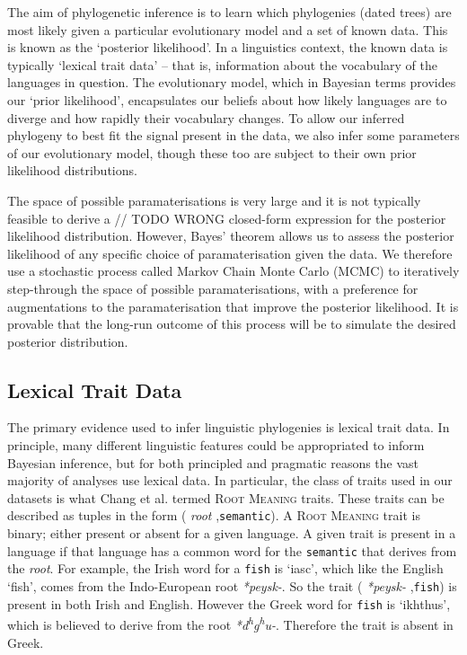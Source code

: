 \documentclass[10pt,journal,compsoc]{IEEEtran}
\newcommand{\ts}{\textsuperscript}
\begin{document}
The aim of phylogenetic inference is to learn which phylogenies (dated trees) are most likely given a particular evolutionary model and a set of known data. This is known as the `posterior likelihood'. In a linguistics context, the known data is typically `lexical trait data' -- that is, information about the vocabulary of the languages in question. The evolutionary model, which in Bayesian terms provides our `prior likelihood', encapsulates our beliefs about how likely languages are to diverge and how rapidly their vocabulary changes. To allow our inferred phylogeny to best fit the signal present in the data, we also infer some parameters of our evolutionary model, though these too are subject to their own prior likelihood distributions.

The space of possible paramaterisations is very large and it is not typically feasible to derive a // TODO WRONG closed-form expression for the posterior likelihood distribution. However, Bayes' theorem allows us to assess the posterior likelihood of any specific choice of paramaterisation given the data. We therefore use a stochastic process called Markov Chain Monte Carlo (MCMC) to iteratively step-through the space of possible paramaterisations, with a preference for augmentations to the paramaterisation that improve the posterior likelihood. It is provable that the long-run outcome of this process will be to simulate the desired posterior distribution.

\subsection{Lexical Trait Data}

The primary evidence used to infer linguistic phylogenies is lexical trait data. In principle, many different linguistic features could be appropriated to inform Bayesian inference, but for both principled and pragmatic reasons the vast majority of analyses use lexical data. In particular, the class of traits used in our datasets is what Chang et al. termed \textsc{Root Meaning} traits. These traits can be described as tuples in the form (\textit{ root },\;\texttt{semantic}\;). A \textsc{Root Meaning} trait is binary; either present or absent for a given language. A given trait is present in a language if that language has a common word for the \texttt{semantic} that derives from the \textit{root}. For example, the Irish word for a \texttt{fish} is `iasc', which like the English `fish', comes from the Indo-European root \textit{*peysk-}. So the trait (\textit{ *peysk- },\;\texttt{fish}\;) is present in both Irish and English. However the Greek word for \texttt{fish} is `ikhthus', which is believed to derive from the root \textit{*d\ts{h}g\ts{h}u-}. Therefore the trait is absent in Greek.
\end{document}
